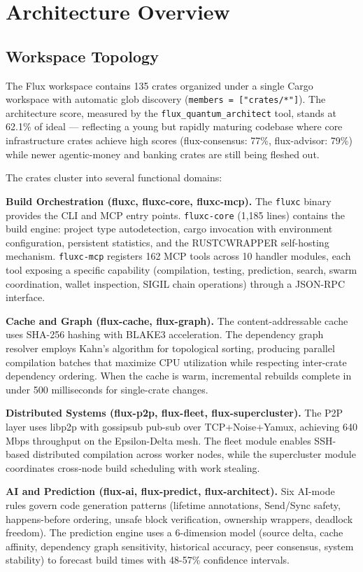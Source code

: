 \documentclass[11pt,a4paper]{article}
\begin{document}
\section{Architecture Overview}

\subsection{Workspace Topology}

The Flux workspace contains 135 crates organized under a single Cargo workspace with automatic glob discovery (\texttt{members = ["crates/*"]}). The architecture score, measured by the \texttt{flux\_quantum\_architect} tool, stands at 62.1\% of ideal — reflecting a young but rapidly maturing codebase where core infrastructure crates achieve high scores (flux-consensus: 77\%, flux-advisor: 79\%) while newer agentic-money and banking crates are still being fleshed out.

The crates cluster into several functional domains:

\textbf{Build Orchestration (fluxc, fluxc-core, fluxc-mcp).} The \texttt{fluxc} binary provides the CLI and MCP entry points. \texttt{fluxc-core} (1,185 lines) contains the build engine: project type autodetection, cargo invocation with environment configuration, persistent statistics, and the RUSTC\textunderscore WRAPPER self-hosting mechanism. \texttt{fluxc-mcp} registers 162 MCP tools across 10 handler modules, each tool exposing a specific capability (compilation, testing, prediction, search, swarm coordination, wallet inspection, SIGIL chain operations) through a JSON-RPC interface.

\textbf{Cache and Graph (flux-cache, flux-graph).} The content-addressable cache uses SHA-256 hashing with BLAKE3 acceleration. The dependency graph resolver employs Kahn's algorithm for topological sorting, producing parallel compilation batches that maximize CPU utilization while respecting inter-crate dependency ordering. When the cache is warm, incremental rebuilds complete in under 500 milliseconds for single-crate changes.

\textbf{Distributed Systems (flux-p2p, flux-fleet, flux-supercluster).} The P2P layer uses libp2p with gossipsub pub-sub over TCP+Noise+Yamux, achieving 640 Mbps throughput on the Epsilon-Delta mesh. The fleet module enables SSH-based distributed compilation across worker nodes, while the supercluster module coordinates cross-node build scheduling with work stealing.

\textbf{AI and Prediction (flux-ai, flux-predict, flux-architect).} Six AI-mode rules govern code generation patterns (lifetime annotations, Send/Sync safety, happens-before ordering, unsafe block verification, ownership wrappers, deadlock freedom). The prediction engine uses a 6-dimension model (source delta, cache affinity, dependency graph sensitivity, historical accuracy, peer consensus, system stability) to forecast build times with 48-57\% confidence intervals.
\end{document}
